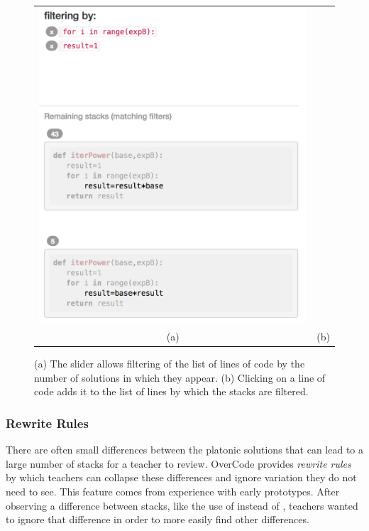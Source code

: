\begin{figure}[htpb]
\begin{tabular}{c | c}
\begin{minipage}{.52\linewidth}
\includegraphics[scale=0.40]{Body/figures/overcode/lineFilter.png}
\end{minipage}
\\
(a) & (b)
\end{tabular}
\caption{(a) The slider allows filtering of the list of lines of code by the number of solutions in which they appear. (b) Clicking on a line of code adds it to the list of lines by which the stacks are filtered.}
\label{linefilter}
\end{figure}

\subsubsection{Rewrite Rules} There are often small differences between the platonic solutions that can lead to a large number of stacks for a teacher to review. OverCode provides \emph{rewrite rules} by which teachers can collapse these differences and ignore variation they do not need to see. This feature comes from experience with early prototypes. After observing a difference between stacks, like the use of  instead of , teachers wanted to ignore that difference in order to more easily find other differences.

